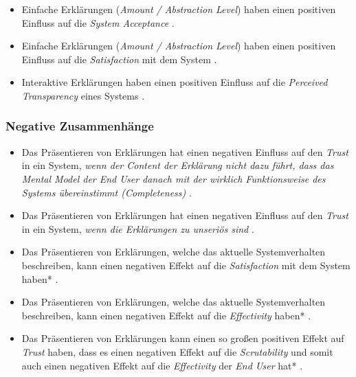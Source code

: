 \begin{itemize}
    \item Einfache Erklärungen (\textit{Amount / Abstraction Level}) haben einen positiven Einfluss auf die \textit{System Acceptance} \cite{hleg2019policy, sovrano_modelling_2020}.
    \item Einfache Erklärungen (\textit{Amount / Abstraction Level}) haben einen positiven Einfluss auf die \textit{Satisfaction} mit dem System \cite{hleg2019policy, sovrano_modelling_2020}.
    \item Interaktive Erklärungen haben einen positiven Einfluss auf die \textit{Perceived Transparency} eines Systems \cite{cheng2019explaining}.
\end{itemize}



\subsubsection*{Negative Zusammenhänge}

\begin{itemize}
    \item Das Präsentieren von Erklärungen hat einen negativen Einfluss auf den \textit{Trust} in ein System, \textit{wenn der Content der Erklärung nicht dazu führt, dass das Mental Model der End User danach mit der wirklich Funktionsweise des Systems übereinstimmt (Completeness)} \cite{schrills_color_2020, chazette_end-users_nodate}.
    \item Das Präsentieren von Erklärungen hat einen negativen Einfluss auf den \textit{Trust} in ein System, \textit{wenn die Erklärungen zu unseriös sind} \cite{wang_is_2018}.
    \item Das Präsentieren von Erklärungen, welche das aktuelle Systemverhalten beschreiben, kann einen negativen Effekt auf die \textit{Satisfaction} mit dem System haben* \cite{koo_why_2015}.
    \item Das Präsentieren von Erklärungen, welche das aktuelle Systemverhalten beschreiben, kann einen negativen Effekt auf die \textit{Effectivity} haben* \cite{koo_why_2015}.
    \item Das Präsentieren von Erklärungen kann einen so großen positiven Effekt auf \textit{Trust} haben, dass es einen negativen Effekt auf die \textit{Scrutability} und somit auch einen negativen Effekt auf die \textit{Effectivity} der \textit{End User} hat* \cite{kohl_explainability_2019, gunning2019darpa}.
\end{itemize}

